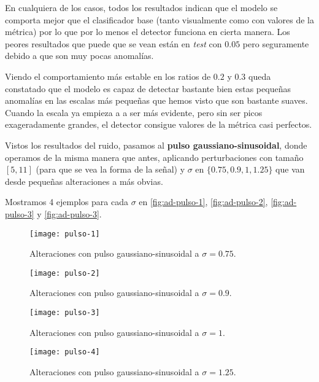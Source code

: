 En cualquiera de los casos, todos los resultados indican que el modelo se comporta mejor que el clasificador base (tanto visualmente como con valores de la métrica) por lo que por lo menos el detector funciona en cierta manera. Los peores resultados que puede que se vean están en \emph{test} con $0.05$ pero seguramente debido a que son muy pocas anomalías.

Viendo el comportamiento más estable en los ratios de $0.2$ y $0.3$ queda constatado que el modelo es capaz de detectar bastante bien estas pequeñas anomalías en las escalas más pequeñas que hemos visto que son bastante suaves. Cuando la escala ya empieza a a ser más evidente, pero sin ser picos exageradamente grandes, el detector consigue valores de la métrica casi perfectos.

Vistos los resultados del ruido, pasamos al \textbf{pulso gaussiano-sinusoidal}, donde operamos de la misma manera que antes, aplicando perturbaciones con tamaño $[5, 11]$ (para que se vea la forma de la señal) y $\sigma$ en $\{0.75, 0.9, 1, 1.25\}$ que van desde pequeñas alteraciones a más obvias.

Mostramos 4 ejemplos para cada $\sigma$ en \autoref{fig:ad-pulso-1}, \autoref{fig:ad-pulso-2}, \autoref{fig:ad-pulso-3} y \autoref{fig:ad-pulso-3}.

\begin{figure}[htpb]
  \centering
  \texttt{[image: pulso-1]}
  \caption{Alteraciones con pulso gaussiano-sinusoidal a $\sigma = 0.75$.}
  \label{fig:ad-pulso-1}
\end{figure}

\begin{figure}[htpb]
  \centering
  \texttt{[image: pulso-2]}
  \caption{Alteraciones con pulso gaussiano-sinusoidal a $\sigma = 0.9$.}
  \label{fig:ad-pulso-2}
\end{figure}

\begin{figure}[htpb]
  \centering
  \texttt{[image: pulso-3]}
  \caption{Alteraciones con pulso gaussiano-sinusoidal a $\sigma = 1$.}
  \label{fig:ad-pulso-3}
\end{figure}

\begin{figure}[htpb]
  \centering
  \texttt{[image: pulso-4]}
  \caption{Alteraciones con pulso gaussiano-sinusoidal a $\sigma = 1.25$.}
  \label{fig:ad-pulso-4}
\end{figure}

